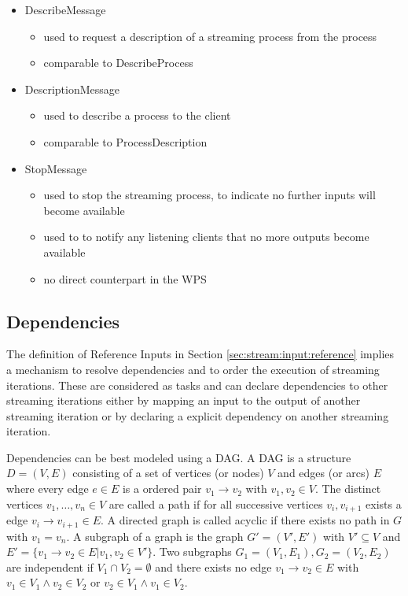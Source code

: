 \begin{itemize}
\begin{itemize}
				\item DescribeMessage
				\begin{itemize}
					\item used to request a description of a streaming process from the process
					\item comparable to DescribeProcess
				\end{itemize}
				\item DescriptionMessage
				\begin{itemize}
					\item used to describe a process to the client
					\item comparable to ProcessDescription
				\end{itemize}
				\item StopMessage
				\begin{itemize}
					\item used to stop the streaming process, to indicate no further inputs will become available
					\item used to to notify any listening clients that no more outputs become available
					\item no direct counterpart in the WPS
				\end{itemize}
			\end{itemize}
		\end{itemize}
	\subsection{Dependencies}\label{sec:stream:dependencies}
		The definition of Reference Inputs in Section \ref{sec:stream:input:reference} implies a mechanism to resolve dependencies and to order the execution of streaming iterations. These are considered as tasks and can declare dependencies to other streaming iterations either by mapping an input to the output of another streaming iteration or by declaring a explicit dependency on another streaming iteration.

		Dependencies can be best modeled using a \ac{DAG}. A \ac{DAG} is a structure $D=(V, E)$ consisting of a set of vertices (or nodes) $V$ and edges (or arcs) $E$ where every edge $e\in E$ is a ordered pair $v_1 \rightarrow v_2$ with $v_1, v_2 \in V$. The distinct vertices $v_1,\dots,v_n\in V$ are called a path if for all successive vertices $v_i, v_{i+1}$ exists a edge $v_i \rightarrow v_{i+1} \in E$. A directed graph is called acyclic if there exists no path in $G$ with $v_1 = v_n$. A subgraph of a graph is the graph $G' = (V', E')$ with $V'\subseteq V$ and $E' = \{v_1 \rightarrow v_2 \in E | v_1, v_2\in V'\}$. Two subgraphs $G_1 = (V_1, E_1), G_2 = (V_2, E_2)$ are independent if $V_1 \cap V_2 = \emptyset$ and there exists no edge $v_1\rightarrow v_2\in E$ with $v_1\in V_1 \wedge v_2\in V_2$ or $v_2\in V_1 \wedge v_1\in V_2$.


